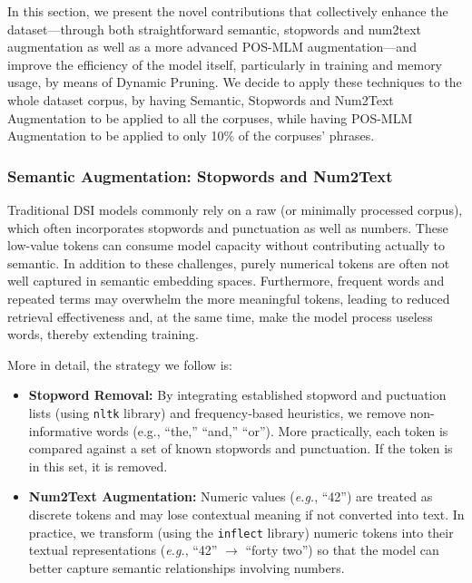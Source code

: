 In this section, we present the novel contributions that collectively enhance the dataset—through both straightforward semantic, stopwords and num2text augmentation as well as a more advanced POS-MLM augmentation—and improve the efficiency of the model itself, particularly in training and memory usage, by means of Dynamic Pruning. We decide to apply these techniques to the whole dataset corpus, by having Semantic, Stopwords and Num2Text Augmentation to be applied to all the corpuses, while having POS-MLM Augmentation to be applied to only 10\% of the corpuses' phrases.








\subsubsection{Semantic Augmentation: Stopwords and Num2Text}
Traditional DSI models commonly rely on a raw (or minimally processed corpus), which often incorporates stopwords and punctuation as well as numbers. These low-value tokens can consume model capacity without contributing actually to semantic.  In addition to these challenges, purely numerical tokens are often not well captured in semantic embedding spaces. Furthermore, frequent words and repeated terms may overwhelm the more meaningful tokens, leading to reduced retrieval effectiveness and, at the same time, make the model process useless words, thereby extending training.

More in detail, the strategy we follow is:
\begin{itemize}
    \item \textbf{Stopword Removal:} By integrating established stopword and puctuation lists (using \texttt{nltk} library) and frequency-based heuristics, we remove non-informative words (e.g., ``the,'' ``and,'' ``or''). More practically, each token is compared against a set of known stopwords and punctuation. If the token is in this set, it is removed.
    \item \textbf{ Num2Text Augmentation:} Numeric values (\textit{e.g.}, ``42'') are treated as discrete tokens and may lose contextual meaning if not converted into text. In practice, we transform (using the \texttt{inflect} library) numeric tokens into their textual representations (\textit{e.g.}, ``42'' $\to$ ``forty two'') so that the model can better capture semantic relationships involving numbers.
\end{itemize}










